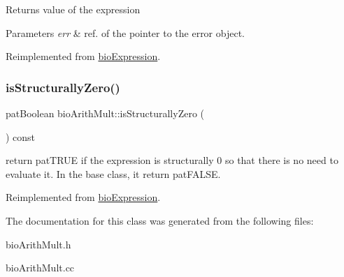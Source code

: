 \begin{DoxyReturn}{Returns}
value of the expression 
\end{DoxyReturn}

\begin{DoxyParams}{Parameters}
{\em err} & ref. of the pointer to the error object. \\
\hline
\end{DoxyParams}


Reimplemented from \hyperlink{classbio_expression_af58662a5d4d456f15bc4f2c9bd4f8a5b}{bio\+Expression}.

\mbox{\label{classbio_arith_mult_aedfa0cf623dde749da1760ad7fd9e326}} 
\subsubsection{\texorpdfstring{is\+Structurally\+Zero()}{isStructurallyZero()}}
{\footnotesize\ttfamily pat\+Boolean bio\+Arith\+Mult\+::is\+Structurally\+Zero (\begin{DoxyParamCaption}{ }\end{DoxyParamCaption}) const\hspace{0.3cm}{\ttfamily [virtual]}}

return pat\+T\+R\+UE if the expression is structurally 0 so that there is no need to evaluate it. In the base class, it return pat\+F\+A\+L\+SE. 

Reimplemented from \hyperlink{classbio_expression_a264c6d78671610ada8261d698e4c4c42}{bio\+Expression}.



The documentation for this class was generated from the following files\+:\begin{DoxyCompactItemize}
\item 
bio\+Arith\+Mult.\+h\item 
bio\+Arith\+Mult.\+cc\end{DoxyCompactItemize}
